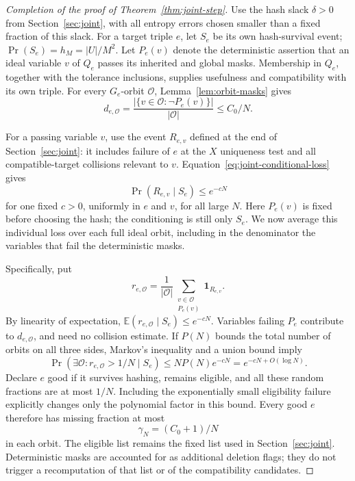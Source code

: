 \begin{proof}[Completion of the proof of Theorem~\ref{thm:joint-step}]
Use the hash slack $\delta>0$ from Section~\ref{sec:joint}, with all
entropy errors chosen smaller than a fixed fraction of this slack.
For a target triple $e$, let $S_e$ be its own hash-survival event;
$\Pr(S_e)=h_M=|U|/M^2$.  Let $P_e(v)$ denote the deterministic
assertion that an ideal variable $v$ of $Q_e$ passes its inherited and
global masks.  Membership in $Q_e$, together with the tolerance
inclusions, supplies usefulness and compatibility with its own triple.
For every $G_e$-orbit $\mathcal O$, Lemma~\ref{lem:orbit-masks} gives
\[
 d_{e,\mathcal O}
 =\frac{|\{v\in\mathcal O:\neg P_e(v)\}|}{|\mathcal O|}
 \leq C_0/N.
\]

For a passing variable $v$, use the event $R_{e,v}$ defined at the
end of Section~\ref{sec:joint}: it includes failure of $e$ at the $X$
uniqueness test and all compatible-target collisions relevant to $v$.
Equation~\eqref{eq:joint-conditional-loss} gives
\begin{equation}
 \Pr(R_{e,v}\mid S_e)\leq e^{-cN}
 \label{eq:conditional-variable-loss}
\end{equation}
for one fixed $c>0$, uniformly in $e$ and $v$, for all large $N$.
Here $P_e(v)$ is fixed before choosing the hash; the conditioning is
still only $S_e$.  We now average this individual loss over each full
ideal orbit, including in the denominator the variables that fail the
deterministic masks.

Specifically, put
\[
 r_{e,\mathcal O}
 =\frac{1}{|\mathcal O|}
   \sum_{\substack{v\in\mathcal O\\P_e(v)}}
       \mathbf1_{R_{e,v}}.
\]
By linearity of expectation,
$\mathbb E(r_{e,\mathcal O}\mid S_e)\leq e^{-cN}$.
Variables failing $P_e$ contribute to $d_{e,\mathcal O}$, and need
no collision estimate.  If $P(N)$ bounds the total number of orbits
on all three sides, Markov's inequality and a union bound imply
\[
 \Pr\left(\exists\mathcal O:r_{e,\mathcal O}>1/N\mid S_e\right)
 \leq NP(N)e^{-cN}=e^{-cN+O(\log N)}.
\]
Declare $e$ good if it survives hashing, remains eligible, and all
these random fractions are at most $1/N$.  Including the exponentially
small eligibility failure explicitly changes only the polynomial
factor in this bound.  Every good $e$ therefore has missing fraction
at most
\begin{equation}
 \gamma_N=(C_0+1)/N
 \label{eq:uniform-good-holes}
\end{equation}
in each orbit.  The eligible list remains the fixed list used in
Section~\ref{sec:joint}.  Deterministic masks are accounted for as
additional deletion flags; they do not trigger a recomputation of
that list or of the compatibility candidates.


\end{proof}
